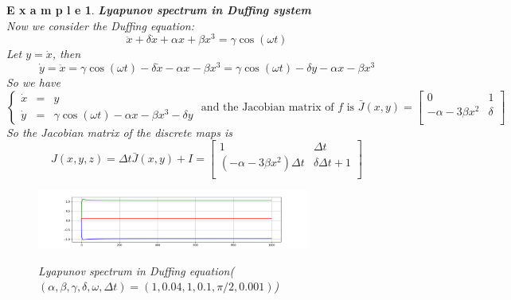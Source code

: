 \documentclass[12pt]{article}
\theoremstyle{plain}
\newtheorem{example}{\textbf{E x a m p l e}}[section]
\begin{document}
\begin{example}\textbf{Lyapunov spectrum in Duffing system}
\\\noindent Now we consider the Duffing equation:
$$
\ddot x + \delta \dot x + \alpha x + \beta x^3 = \gamma \cos(\omega t)
$$
Let $y = \dot x$, then 
$$
\dot y = \ddot x = \gamma \cos(\omega t) - \delta\dot x - \alpha x - \beta x^3 = \gamma \cos(\omega t) - \delta y - \alpha x - \beta x^3
$$
So we have 
$$
\left\{\begin{array}{lll}
\dot x & = & y \\
\dot y & = & \gamma \cos(\omega t) - \alpha x - \beta x^3 - \delta y 
\end{array}\right. \text{ and the Jacobian matrix of $f$ is } \bar J(x, y) = \left[\begin{array}{ll}
0                               & 1             \\
-\alpha -3\beta x^2             & \delta        \\
\end{array}\right]
$$
So the Jacobian matrix of the discrete maps is 
$$
J(x, y, z) = \Delta t\bar J(x, y) + I = \left[\begin{array}{lll}
1                               & \Delta t              \\
(-\alpha -3\beta x^2)\Delta t   & \delta \Delta t + 1   \\
\end{array}\right]
$$
\begin{figure}[H]
\begin{center}
\includegraphics[width=0.8\textwidth]{figure/section5/Lya-spe-Duffing.png} \\
\caption{Lyapunov spectrum in Duffing equation($(\alpha, \beta, \gamma, \delta, \omega, \Delta t) = (1, 0.04, 1, 0.1, \pi/2, 0.001)$)}
\end{center}
\end{figure}
\end{example}
\end{document}
